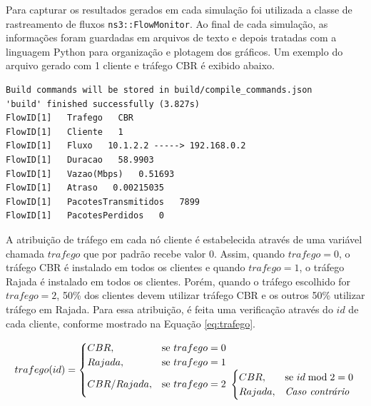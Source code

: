 \documentclass[12pt]{article}
\begin{document}
Para capturar os resultados gerados em cada simulação foi utilizada a classe de rastreamento de fluxos \texttt{ns3::FlowMonitor}. Ao final de cada simulação, as informações foram guardadas em arquivos de texto e depois tratadas com a linguagem Python para organização e plotagem dos gráficos. Um exemplo do arquivo gerado com 1 cliente e tráfego CBR é exibido abaixo.

\begin{verbatim}
Build commands will be stored in build/compile_commands.json
'build' finished successfully (3.827s)
FlowID[1]   Trafego   CBR
FlowID[1]   Cliente   1
FlowID[1]   Fluxo   10.1.2.2 -----> 192.168.0.2
FlowID[1]   Duracao   58.9903
FlowID[1]   Vazao(Mbps)   0.51693
FlowID[1]   Atraso   0.00215035
FlowID[1]   PacotesTransmitidos   7899
FlowID[1]   PacotesPerdidos   0
\end{verbatim}

A atribuição de tráfego em cada nó cliente é estabelecida através de uma variável chamada $trafego$ que por padrão recebe valor $0$. Assim, quando $trafego = 0$, o tráfego CBR é instalado em todos os clientes e quando $trafego = 1$, o tráfego Rajada é instalado em todos os clientes. Porém, quando o tráfego escolhido for $trafego = 2$, 50\% dos clientes devem utilizar tráfego CBR e os outros 50\% utilizar tráfego em Rajada. Para essa atribuição, é feita uma verificação através do $id$ de cada cliente, conforme mostrado na Equação \ref{eq:trafego}.

\begin{equation}
\label{eq:trafego}
trafego(id) =
	\begin{cases} 
      CBR, &  \text{se } trafego = 0\\
      Rajada, &  \text{se } trafego = 1\\
      CBR/Rajada, & \text{se } trafego = 2  
      ~\begin{cases} 
        CBR, &  \text{se } id \bmod 2 = 0\\
        Rajada, & \text{\textit{Caso contrário}}\\
	  \end{cases}
      \\
	\end{cases}
\end{equation}

\end{document}
